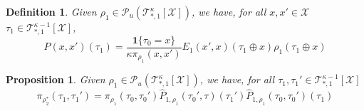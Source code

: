 \documentclass[12pt]{article}
\newtheorem{proposition}[theorem]{Proposition}
\newtheorem{definition}[theorem]{Definition}
\newcommand{\one}[1]{\mathbf{1}\{#1\}}
\newcommand{\tree}[2]{\mathcal{T}_{*, #1}^{#2}[\mathcal{X}]}
\numberwithin{equation}{section}
\begin{document}
\begin{definition}
    Given $\rho_1 \in \mathcal{P}_u(\tree{1}{\kappa})$, we have, for all $x, x' \in \mathcal{X}$ $\tau_1 \in \tree{1}{\kappa-1}$,
    \begin{equation*}
        \widehat{P}(x, x')(\tau_1) = \frac{\one{\tau_0 = x}}{\kappa \pi_{\rho_1}(x, x')} E_1(x', x)(\tau_1\oplus x) \rho_1(\tau_1\oplus x)
    \end{equation*}
\end{definition}

\begin{proposition}
    Given $\rho_1 \in \mathcal{P}_u(\tree{1}{\kappa})$, we have, for all $\tau_1, \tau_1' \in \tree{1}{\kappa-1}$
    \begin{equation}\label{Eq.NNNI-pi-rho2-star}
        \pi_{\rho_2^*}(\tau_1, \tau_1') = \pi_{\rho_1}(\tau_0, \tau_0')\widehat{P}_{1, \rho_1}(\tau_0', \tau)(\tau_1')\widehat{P}_{1, \rho_1}(\tau_0, \tau_0')(\tau_1)
    \end{equation}
\end{proposition}
\end{document}
